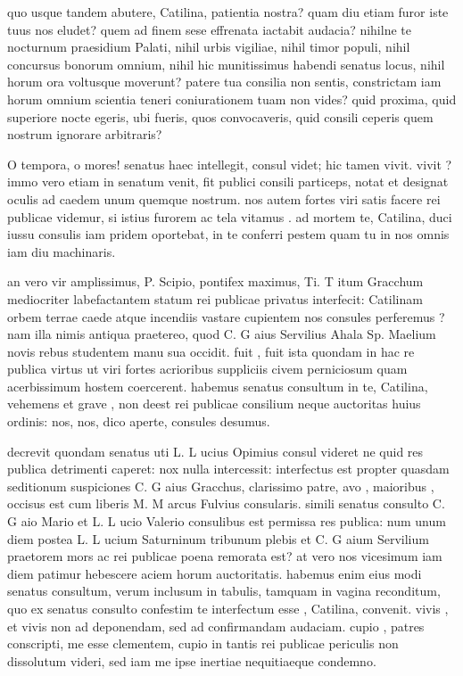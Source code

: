 
 quo usque tandem abutere, Catilina, patientia nostra? quam diu etiam furor iste tuus nos eludet? quem ad finem sese effrenata iactabit audacia? nihilne te nocturnum praesidium Palati, nihil urbis vigiliae, nihil timor populi, nihil concursus bonorum omnium, nihil hic munitissimus habendi senatus locus, nihil horum ora voltusque moverunt? patere tua consilia non sentis, constrictam iam horum omnium scientia teneri coniurationem tuam non vides? quid proxima, quid superiore nocte egeris, ubi fueris, quos convocaveris, quid consili ceperis quem nostrum ignorare arbitraris?

 O tempora, o mores! senatus haec intellegit, consul videt; hic tamen vivit. vivit ? immo vero etiam in senatum venit, fit publici consili particeps, notat et designat oculis ad caedem unum quemque nostrum. nos autem fortes viri satis facere rei publicae videmur, si istius furorem ac tela vitamus . ad mortem te, Catilina, duci iussu consulis iam pridem oportebat, in te conferri pestem quam tu in nos omnis iam diu machinaris.

 an vero vir amplissimus, P. Scipio, pontifex maximus, Ti. T itum Gracchum mediocriter labefactantem statum rei publicae privatus interfecit: Catilinam orbem terrae caede atque incendiis vastare cupientem nos consules perferemus ? nam illa nimis antiqua praetereo, quod C. G aius Servilius Ahala Sp. Maelium novis rebus studentem manu sua occidit. fuit , fuit ista quondam in hac re publica virtus ut viri fortes acrioribus suppliciis civem perniciosum quam acerbissimum hostem coercerent. habemus senatus consultum in te, Catilina, vehemens et grave , non deest rei publicae consilium neque auctoritas huius ordinis: nos, nos, dico aperte, consules desumus.

 decrevit quondam senatus uti L. L ucius Opimius consul videret ne quid res publica detrimenti caperet: nox nulla intercessit: interfectus est propter quasdam seditionum suspiciones C. G aius Gracchus, clarissimo patre, avo , maioribus , occisus est cum liberis M. M arcus Fulvius consularis. simili senatus consulto C. G aio Mario et L. L ucio Valerio consulibus est permissa res publica: num unum diem postea L. L ucium Saturninum tribunum plebis et C. G aium Servilium praetorem mors ac rei publicae poena remorata est? at vero nos vicesimum iam diem patimur hebescere aciem horum auctoritatis. habemus enim eius modi senatus consultum, verum inclusum in tabulis, tamquam in vagina reconditum, quo ex senatus consulto confestim te interfectum esse , Catilina, convenit. vivis , et vivis non ad deponendam, sed ad confirmandam audaciam. cupio , patres conscripti, me esse clementem, cupio in tantis rei publicae periculis non dissolutum videri, sed iam me ipse inertiae nequitiaeque condemno.

